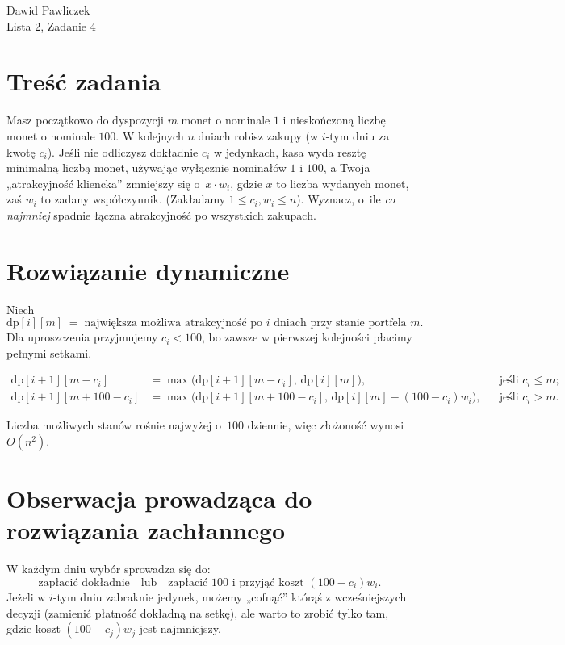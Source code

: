 \documentclass[11pt,a4paper]{article}
\begin{document}
\begin{center}
\Large Dawid Pawliczek\\
Lista 2, Zadanie 4
\end{center}

\bigskip
\section*{Treść zadania}
Masz początkowo do dyspozycji $m$ monet o nominale $1$ i nieskończoną
liczbę monet o nominale $100$.
W kolejnych $n$ dniach robisz zakupy
(w $i$-tym dniu za kwotę $c_i$).
Jeśli nie odliczysz dokładnie $c_i$ w jedynkach,
kasa wyda resztę minimalną liczbą monet,
używając wyłącznie nominałów $1$ i $100$,
a Twoja „atrakcyjność kliencka” zmniejszy się
o~$x\cdot w_i$, gdzie $x$ to liczba wydanych monet,
zaś $w_i$ to zadany współczynnik.
(Zakładamy $1\le c_i,w_i\le n$).
Wyznacz, o~ile \emph{co najmniej} spadnie
łączna atrakcyjność po wszystkich zakupach.

\bigskip
\section*{Rozwiązanie dynamiczne}

Niech
\[
  \text{dp}[i][m]\;=\;
  \text{największa możliwa atrakcyjność po } i\text{ dniach}
  \text{ przy stanie portfela } m.
\]
Dla uproszczenia przyjmujemy $c_i<100$,
bo zawsze w pierwszej kolejności płacimy pełnymi setkami.

\begin{align*}
\text{dp}[i+1][m-c_i]
  &=\max\bigl(\text{dp}[i+1][m-c_i],\,\text{dp}[i][m]\bigr),
  &&\text{jeśli }c_i\le m;\\[4pt]
\text{dp}[i+1][m+100-c_i]
  &=\max\bigl(\text{dp}[i+1][m+100-c_i],
              \,\text{dp}[i][m]-(100-c_i)w_i\bigr),
  &&\text{jeśli }c_i>m.
\end{align*}

Liczba możliwych stanów rośnie najwyżej
o~$100$ dziennie, więc
złożoność wynosi $O(n^2)$.

\bigskip
\section*{Obserwacja prowadząca do rozwiązania zachłannego}

W każdym dniu wybór sprowadza się do:
\[
  \boxed{\text{zapłacić dokładnie}} 
  \quad\text{lub}\quad
  \boxed{\text{zapłacić }100\text{ i przyjąć koszt }(100-c_i)w_i.}
\]
Jeżeli w $i$-tym dniu zabraknie jedynek,
możemy „cofnąć” którąś z wcześniejszych decyzji
(zamienić płatność dokładną na setkę),
ale warto to zrobić tylko tam,
gdzie koszt $(100-c_j)w_j$ jest najmniejszy.
\end{document}
